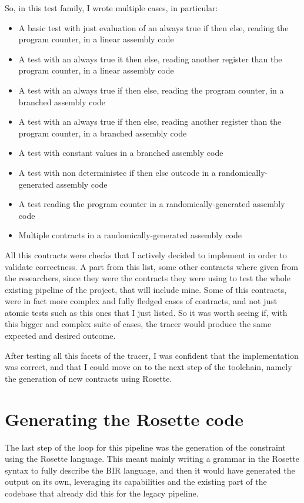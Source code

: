 So, in this test family, I wrote multiple cases, in particular:
\begin{itemize}
  \item A basic test with just evaluation of an always true if then else,
    reading the program counter, in a linear assembly code

  \item A test with an always true it then else, reading another register than
    the program counter, in a linear assembly code

  \item A test with an always true if then else, reading the program counter, in
    a branched assembly code

  \item A test with an always true if then else, reading another register than
    the program counter, in a branched assembly code

  \item A test with constant values in a branched assembly code

  \item A test with non deterministec if then else outcode in a randomically-generated
    assembly code

  \item A test reading the program counter in a randomically-generated assembly code

  \item Multiple contracts in a randomically-generated assembly code
\end{itemize}

All this contracts were checks that I actively decided to implement in order to validate
correctness. A part from this list, some other contracts where given from the researchers,
since they were the contracts they were using to test the whole existing
pipeline of the project, that will include mine. Some of this contracts, were in
fact more complex and fully fledged cases of contracts, and not just atomic
tests such as this ones that I just listed. So it was worth seeing if, with this
bigger and complex suite of cases, the tracer would produce the same expected and
desired outcome.

After testing all this facets of the tracer, I was confident that the
implementation was correct, and that I could move on to the next step of the toolchain,
namely the generation of new contracts using Rosette.

\section{Generating the Rosette code}
\label{cha:Generating the Rosette code} The last step of the loop for this
pipeline was the generation of the constraint using the Rosette language. This meant
mainly writing a grammar in the Rosette syntax to fully describe the BIR language,
and then it would have generated the output on its own, leveraging its capabilities
and the existing part of the codebase that already did this for the legacy pipeline.

